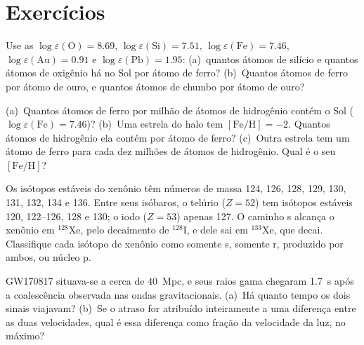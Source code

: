 \section*{Exercícios}

\begin{exercise}[$\star$]\label{exo:b3:origin-of-elements:1}
Use as  $\log\varepsilon(\mathrm{O}) = 8.69$,
$\log\varepsilon(\mathrm{Si}) = 7.51$, $\log\varepsilon(\mathrm{Fe}) =
7.46$, $\log\varepsilon(\mathrm{Au}) = 0.91$ e
$\log\varepsilon(\mathrm{Pb}) = 1.95$: (a)~quantos átomos de silício e
quantos átomos de oxigênio há no Sol por átomo de ferro? (b)~Quantos
átomos de ferro por átomo de ouro, e quantos átomos de chumbo por átomo de ouro?
\end{exercise}

\begin{exercise}[$\star$]\label{exo:b3:origin-of-elements:2}
(a)~Quantos átomos de ferro por milhão de átomos de hidrogênio contém o Sol
($\log\varepsilon(\mathrm{Fe}) = 7.46$)? (b)~Uma estrela do halo tem
$[\mathrm{Fe/H}] = -2$. Quantos átomos de hidrogênio ela contém por
átomo de ferro? (c)~Outra estrela tem um átomo de ferro para cada dez milhões
de átomos de hidrogênio. Qual é o seu $[\mathrm{Fe/H}]$?
\end{exercise}

\begin{exercise}[$\star$]\label{exo:b3:origin-of-elements:3}
Os isótopos estáveis do xenônio têm números de massa 124, 126, 128, 129, 130,
131, 132, 134 e 136. Entre seus isóbaros, o telúrio ($Z = 52$) tem
isótopos estáveis 120, 122--126, 128 e 130; o iodo ($Z = 53$) apenas 127.
O caminho s alcança o xenônio em $^{128}\mathrm{Xe}$, pelo decaimento de
$^{128}\mathrm{I}$, e dele sai em $^{133}\mathrm{Xe}$, que decai.
Classifique cada isótopo de xenônio como somente s, somente r, produzido
por ambos, ou núcleo p.
\end{exercise}

\begin{exercise}[$\star$]\label{exo:b3:origin-of-elements:4}
GW170817 situava-se a cerca de \qty{40}{Mpc}, e seus raios gama chegaram
\qty{1.7}{s} após a coalescência observada nas ondas gravitacionais. (a)~Há quanto tempo
os dois sinais viajavam? (b)~Se o atraso for atribuído inteiramente a uma
diferença entre as duas velocidades, qual é essa diferença como fração
da velocidade da luz, no máximo?
\end{exercise}

